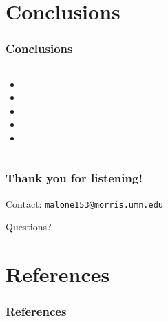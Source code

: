 \documentclass{beamer}
\newcommand{\linespace}{\vskip 0.25cm}
\begin{document}
\section[Conclusions]{Conclusions}

\begin{frame}
  \frametitle{Conclusions}
  
  \begin{columns}
  \begin{column}{0.6\textwidth}
  \begin{itemize}
  	\item 
	\item 
	\item 
	\item 
	\item 
  \end{itemize}
  \end{column}
  \end{columns}
\end{frame}




\begin{frame}
	\frametitle{Thank you for listening!}
	
	
		
	\linespace
	\linespace
	
	Contact:  
		\texttt{malone153@morris.umn.edu}
	
	\linespace
	\linespace
	
	\begin{center}
	{\huge Questions?}
	\end{center}
\end{frame}

\section*{References}

\begin{frame} 
	\frametitle{References} 
	
	
	
	
\end{frame} 
\end{document}
